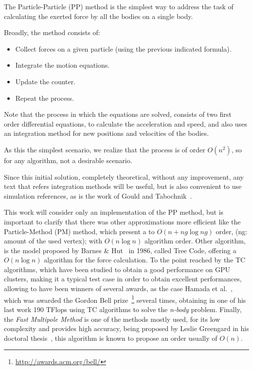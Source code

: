 

The Particle-Particle (PP) method is the simplest way to address
the task of calculating the exerted force by all the bodies on a single body.

Broadly, the method consists of:
\begin {itemize}
	\item Collect forces on a given particle (using the previous indicated formula).
	\item Integrate the motion equations.
	\item Update the counter.
	\item Repeat the process.
\end {itemize}

Note that the process in which the equations are solved,
consists of two first order differential equations,
to calculate the acceleration and speed,
and also uses an integration method for new positions and
velocities of the bodies.

As this the simplest scenario,
we realize that the process is of order $O(n^{2})$,
so for any algorithm, not a desirable scenario.

Since this initial solution, completely theoretical,
without any improvement, any text that refers integration methods will be useful,
but is also convenient to use simulation references,
as is the work of Gould and Tabochnik~\cite{methods}.


This work will consider only an implementation
of the PP method, but is important to clarify
that there was other approximations more efficient
like the Particle-Method (PM) method,
which present a to $O(n + ng\log ng)$ order,
(ng: amount of the used vertex);
with $O(n\log n)$ algorithm order.
Other algorithm, is the model proposed by Barnes \& Hut~\cite{treecode} in 1986,
called Tree Code, offering a $O(n\log n)$ algorithm for the force
calculation.
To the point reached by the TC algorithms,
which have been studied to obtain a good performance
on GPU clusters, making it a typical test case
in order to obtain excellent performances,
allowing to have been winners of several awards,
as the case Hamada et al.~\cite{hamada},
which was awarded the Gordon Bell prize~\footnote{\url{http://awards.acm.org/bell/}}
several times, obtaining in one of his last work
190 TFlops using TC algorithms to solve the \emph{n-body} problem.
Finally, the \emph{Fast Multipole Method} is one of the methods
mostly used, for its low complexity and provides high accuracy,
being proposed by Leslie Greengard in his doctoral thesis~\cite{leslie},
this algorithm is known to propose an order usually of $O(n)$.

